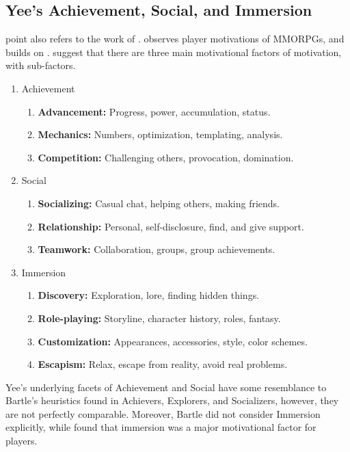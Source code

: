 \documentclass[../Main.tex]{subfiles}
\begin{document}
\subsection{Yee’s Achievement, Social, and Immersion}
\citeauthor{hamari_player_2014} point also refers to the work of \citet{yee_motivations_2007}. \citet{yee_motivations_2007} observes player motivations of MMORPGs, and builds on \citet{bartle_hearts_1996}. \citet{yee_motivations_2007} suggest that there are three main motivational factors of motivation, with sub-factors.

\begin{enumerate}
    \item Achievement 
        \begin{enumerate}
            \item \textbf{Advancement:} Progress, power, accumulation, status. 
            \item \textbf{Mechanics:} Numbers, optimization, templating, analysis. 
            \item \textbf{Competition:} Challenging others, provocation, domination. 
        \end{enumerate}
    \item Social 
        \begin{enumerate}
            \item \textbf{Socializing:} Casual chat, helping others, making friends. 
            \item \textbf{Relationship:} Personal, self-disclosure, find, and give support. 
            \item \textbf{Teamwork:} Collaboration, groups, group achievements. 
        \end{enumerate}
    \item Immersion
        \begin{enumerate}
            \item \textbf{Discovery:} Exploration, lore, finding hidden things. 
            \item \textbf{Role-playing:} Storyline, character history, roles, fantasy. 
            \item \textbf{Customization:} Appearances, accessories, style, color schemes. 
            \item \textbf{Escapism:} Relax, escape from reality, avoid real problems.
        \end{enumerate}
\end{enumerate}

Yee’s underlying facets of Achievement and Social have some resemblance to Bartle’s heuristics found in Achievers, Explorers, and Socializers, however, they are not perfectly comparable. Moreover, Bartle did not consider Immersion explicitly, while \citep{yee_motivations_2007} found that immersion was a major motivational factor for players.
\end{document}
